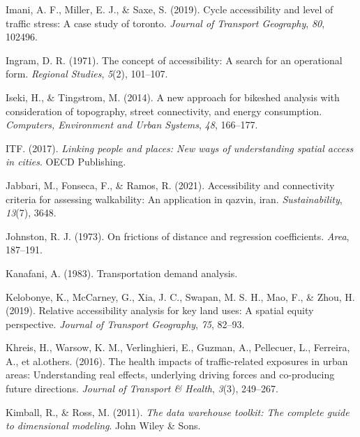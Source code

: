\documentclass[
11pt, %
oneside, %
english, %
singlespacing, %
]{macthesis} %
\newlength{\cslhangindent}
\newenvironment{CSLReferences}[2] %
 {%
  \setlength{\parindent}{0pt}
  \ifodd #1 \everypar{\setlength{\hangindent}{\cslhangindent}}\ignorespaces\fi
  \ifnum #2 > 0
  \setlength{\parskip}{#2\baselineskip}
  \fi
 }%
 {}
\begin{document}
\begin{CSLReferences}{1}{0}
\leavevmode{}%
Imani, A. F., Miller, E. J., \& Saxe, S. (2019). Cycle accessibility and level of traffic stress: A case study of toronto. \emph{Journal of Transport Geography}, \emph{80}, 102496.

\leavevmode{}%
Ingram, D. R. (1971). The concept of accessibility: A search for an operational form. \emph{Regional Studies}, \emph{5}(2), 101--107.

\leavevmode{}%
Iseki, H., \& Tingstrom, M. (2014). A new approach for bikeshed analysis with consideration of topography, street connectivity, and energy consumption. \emph{Computers, Environment and Urban Systems}, \emph{48}, 166--177.

\leavevmode{}%
ITF. (2017). \emph{Linking people and places: New ways of understanding spatial access in cities}. OECD Publishing.

\leavevmode{}%
Jabbari, M., Fonseca, F., \& Ramos, R. (2021). Accessibility and connectivity criteria for assessing walkability: An application in qazvin, iran. \emph{Sustainability}, \emph{13}(7), 3648.

\leavevmode{}%
Johnston, R. J. (1973). On frictions of distance and regression coefficients. \emph{Area}, 187--191.

\leavevmode{}%
Kanafani, A. (1983). Transportation demand analysis.

\leavevmode{}%
Kelobonye, K., McCarney, G., Xia, J. C., Swapan, M. S. H., Mao, F., \& Zhou, H. (2019). Relative accessibility analysis for key land uses: A spatial equity perspective. \emph{Journal of Transport Geography}, \emph{75}, 82--93.

\leavevmode{}%
Khreis, H., Warsow, K. M., Verlinghieri, E., Guzman, A., Pellecuer, L., Ferreira, A., et al.others. (2016). The health impacts of traffic-related exposures in urban areas: Understanding real effects, underlying driving forces and co-producing future directions. \emph{Journal of Transport \& Health}, \emph{3}(3), 249--267.

\leavevmode{}%
Kimball, R., \& Ross, M. (2011). \emph{The data warehouse toolkit: The complete guide to dimensional modeling}. John Wiley \& Sons.


\end{CSLReferences}
\end{document}
